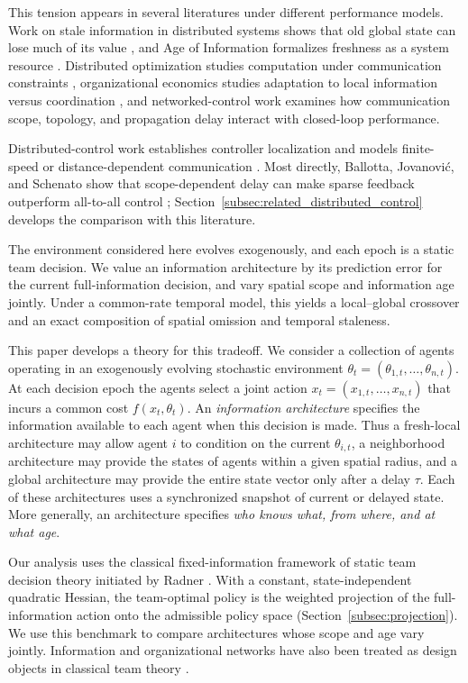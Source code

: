 \documentclass[11pt]{article}
\begin{document}
This tension appears in several literatures under different performance
models. Work on stale information in distributed systems shows that old global
state can lose much of its value \cite{mitzenmacher2000old}, and Age of
Information formalizes freshness as a system resource \cite{kaul2012realtime}.
Distributed optimization studies computation under communication constraints
\cite{nedic2009distributed}, organizational economics studies adaptation to
local information versus coordination \cite{alonso2008coordination}, and
networked-control work examines how communication scope, topology, and
propagation delay interact with closed-loop performance.

Distributed-control work establishes controller localization and models
finite-speed or distance-dependent communication
\cite{bamieh2002spatial,voulgaris2003optimal,bamieh2005convex,
fardad2011finite}. Most directly, Ballotta, Jovanovi\'c, and Schenato show that
scope-dependent delay can make sparse feedback outperform all-to-all control
\cite{ballotta2023latency}; Section~\ref{subsec:related_distributed_control}
develops the comparison with this literature.

The environment considered here evolves exogenously, and each epoch is a static
team decision. We value an information architecture by its prediction error for
the current full-information decision, and vary spatial scope and information
age jointly. Under a common-rate temporal model, this yields a local--global
crossover and an exact composition of spatial omission and temporal staleness.

This paper develops a theory for this tradeoff. We consider a collection of
agents operating in an exogenously evolving stochastic environment
$\theta_t=(\theta_{1,t},\ldots,\theta_{n,t})$. At each decision epoch the agents
select a joint action $x_t=(x_{1,t},\ldots,x_{n,t})$ that incurs a common cost
$f(x_t,\theta_t)$. An \emph{information architecture} specifies the information
available to each agent when this decision is made. Thus a fresh-local
architecture may allow agent $i$ to condition on the current $\theta_{i,t}$,
a neighborhood architecture may provide the states of agents within a given
spatial radius, and a global architecture may provide the entire state vector
only after a delay $\tau$. Each of these architectures uses a synchronized
snapshot of current or delayed state. More generally, an architecture specifies
\emph{who knows what, from where, and at what age}.

Our analysis uses the classical fixed-information framework of static team
decision theory initiated by Radner \cite{radner1962team}. With a constant,
state-independent quadratic Hessian, the team-optimal policy is the weighted
projection of the full-information action onto the admissible policy space
(Section~\ref{subsec:projection}). We use this benchmark to compare architectures
whose scope and age vary jointly. Information and organizational networks have
also been treated as design objects in classical team theory
\cite{marschak1972economic,summers2017information}.
\end{document}
